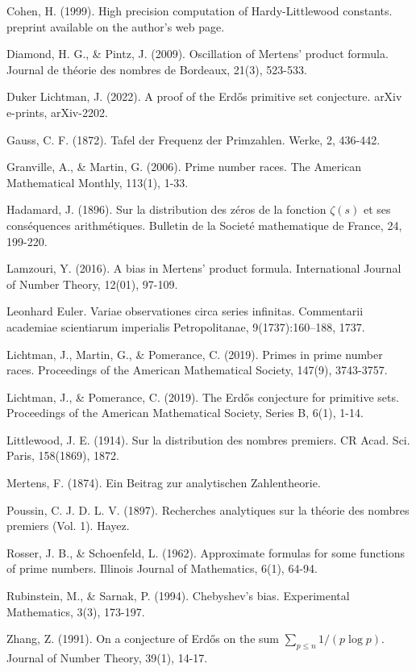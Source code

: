 \documentclass[12pt,reqno]{amsart}
\theoremstyle{definition}
\numberwithin{equation}{section}
\begin{document}
\begin{thebibliography}{99}
    Cohen, H. (1999). High precision computation of Hardy-Littlewood constants. preprint available on the author’s web page.

    Diamond, H. G., \& Pintz, J. (2009). Oscillation of Mertens’ product formula. Journal de théorie des nombres de Bordeaux, 21(3), 523-533.

    Duker Lichtman, J. (2022). A proof of the Erdős primitive set conjecture. arXiv e-prints, arXiv-2202.

    Gauss, C. F. (1872). Tafel der Frequenz der Primzahlen. Werke, 2, 436-442.

    Granville, A., \& Martin, G. (2006). Prime number races. The American Mathematical Monthly, 113(1), 1-33.

    Hadamard, J. (1896). Sur la distribution des zéros de la fonction $\zeta (s) $ et ses conséquences arithmétiques. Bulletin de la Societé mathematique de France, 24, 199-220.

    Lamzouri, Y. (2016). A bias in Mertens’ product formula. International Journal of Number Theory, 12(01), 97-109.

    Leonhard Euler. Variae observationes circa series infinitas. Commentarii academiae scientiarum imperialis Petropolitanae, 9(1737):160–188, 1737.

    Lichtman, J., Martin, G., \& Pomerance, C. (2019). Primes in prime number races. Proceedings of the American Mathematical Society, 147(9), 3743-3757.

    Lichtman, J., \& Pomerance, C. (2019). The Erdős conjecture for primitive sets. Proceedings of the American Mathematical Society, Series B, 6(1), 1-14.

    Littlewood, J. E. (1914). Sur la distribution des nombres premiers. CR Acad. Sci. Paris, 158(1869), 1872.

    Mertens, F. (1874). Ein Beitrag zur analytischen Zahlentheorie.

    Poussin, C. J. D. L. V. (1897). Recherches analytiques sur la théorie des nombres premiers (Vol. 1). Hayez.

    Rosser, J. B., \& Schoenfeld, L. (1962). Approximate formulas for some functions of prime numbers. Illinois Journal of Mathematics, 6(1), 64-94.

    Rubinstein, M., \& Sarnak, P. (1994). Chebyshev's bias. Experimental Mathematics, 3(3), 173-197.

    Zhang, Z. (1991). On a conjecture of Erd\H{o}s on the sum $\sum_{p \le n}1/(p\log p)$. Journal of Number Theory, 39(1), 14-17.
\end{thebibliography}
\end{document}
